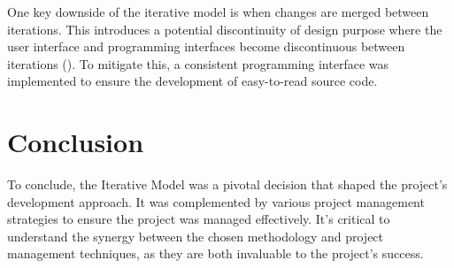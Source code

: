 One key downside of the iterative model is when changes are merged between iterations. This introduces a potential discontinuity of design purpose where the user interface and programming interfaces become discontinuous between iterations (\cite{dapeng_liu_case_2011}). To mitigate this, a consistent programming interface was implemented to ensure the development of easy-to-read source code.

\section{Conclusion}

To conclude, the Iterative Model was a pivotal decision that shaped the project's development approach. It was complemented by various project management strategies  to ensure the project was managed effectively. It's critical to understand the synergy between the chosen methodology and project management techniques, as they are both invaluable to the project's success.
